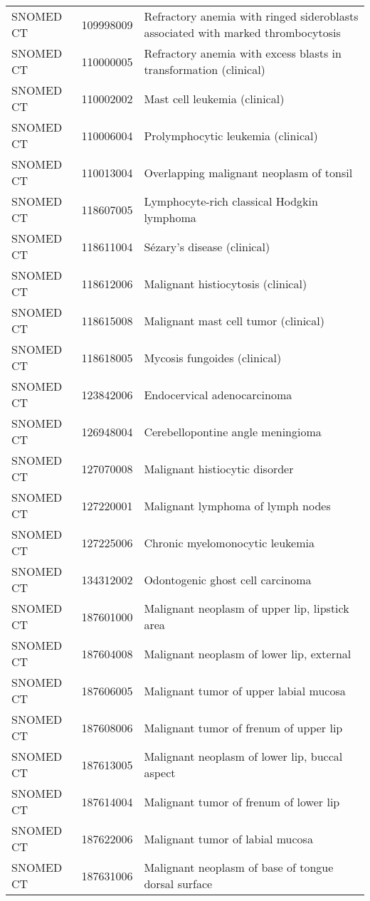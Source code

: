 \begin{longtable}{p{}p{}p{}}
  SNOMED CT & 109998009 & Refractory anemia with ringed sideroblasts associated with marked thrombocytosis \\ 
  SNOMED CT & 110000005 & Refractory anemia with excess blasts in transformation (clinical) \\ 
  SNOMED CT & 110002002 & Mast cell leukemia (clinical) \\ 
  SNOMED CT & 110006004 & Prolymphocytic leukemia (clinical) \\ 
  SNOMED CT & 110013004 & Overlapping malignant neoplasm of tonsil \\ 
  SNOMED CT & 118607005 & Lymphocyte-rich classical Hodgkin lymphoma \\ 
  SNOMED CT & 118611004 & Sézary's disease (clinical) \\ 
  SNOMED CT & 118612006 & Malignant histiocytosis (clinical) \\ 
  SNOMED CT & 118615008 & Malignant mast cell tumor (clinical) \\ 
  SNOMED CT & 118618005 & Mycosis fungoides (clinical) \\ 
  SNOMED CT & 123842006 & Endocervical adenocarcinoma \\ 
  SNOMED CT & 126948004 & Cerebellopontine angle meningioma \\ 
  SNOMED CT & 127070008 & Malignant histiocytic disorder \\ 
  SNOMED CT & 127220001 & Malignant lymphoma of lymph nodes \\ 
  SNOMED CT & 127225006 & Chronic myelomonocytic leukemia \\ 
  SNOMED CT & 134312002 & Odontogenic ghost cell carcinoma \\ 
  SNOMED CT & 187601000 & Malignant neoplasm of upper lip, lipstick area \\ 
  SNOMED CT & 187604008 & Malignant neoplasm of lower lip, external \\ 
  SNOMED CT & 187606005 & Malignant tumor of upper labial mucosa \\ 
  SNOMED CT & 187608006 & Malignant tumor of frenum of upper lip \\ 
  SNOMED CT & 187613005 & Malignant neoplasm of lower lip, buccal aspect \\ 
  SNOMED CT & 187614004 & Malignant tumor of frenum of lower lip \\ 
  SNOMED CT & 187622006 & Malignant tumor of labial mucosa \\ 
  SNOMED CT & 187631006 & Malignant neoplasm of base of tongue dorsal surface \\ 

\end{longtable}
